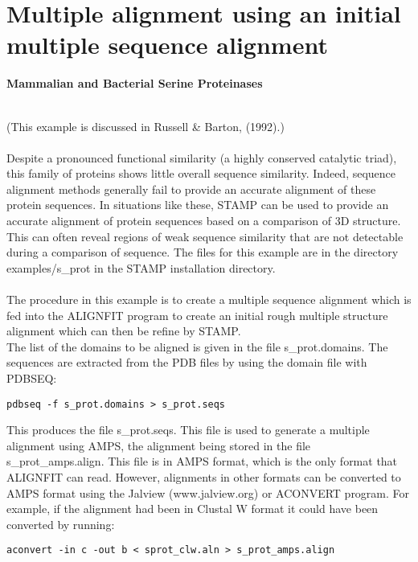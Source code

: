 \section{Multiple alignment using an initial multiple sequence alignment}

{\bf Mammalian and Bacterial Serine Proteinases}
\label{ser_prot}

\\
(This example is discussed in Russell \& Barton, (1992).\nocite{rb92b})\\
\\
Despite a pronounced functional similarity (a highly conserved catalytic 
triad), this family of proteins shows little overall sequence similarity.  
Indeed, sequence alignment methods generally fail to provide an accurate
alignment of these protein sequences.  In situations like these, STAMP 
can be used to provide an accurate alignment of protein sequences based 
on a comparison of 3D structure.  This can often reveal regions of weak 
sequence similarity that are not detectable during a comparison of 
sequence.  The files for this example are in the directory examples/s\_prot in the 
STAMP installation directory.\\
\\
The procedure in this example is to create a multiple sequence alignment which
is fed into the ALIGNFIT program to create an initial rough multiple
structure alignment which can then be refine by STAMP. 
\\
The list of the domains to be aligned is given in the file s\_prot.domains. 
The sequences are extracted from the PDB files by using the domain file
with PDBSEQ:\\

\begin{scriptsize}\begin{verbatim}
pdbseq -f s_prot.domains > s_prot.seqs
\end{verbatim} \end{scriptsize}

This produces the file s\_prot.seqs. This file is used to generate
a multiple alignment using AMPS, the alignment being stored in the file 
s\_prot\_amps.align. This file is in AMPS format, which is the only format
that ALIGNFIT can read. However, alignments in other formats can be converted
to AMPS format using the Jalview (www.jalview.org) or ACONVERT program. For example, if the alignment had been in Clustal W 
format it could have been converted by running:

\begin{scriptsize}\begin{verbatim}
aconvert -in c -out b < sprot_clw.aln > s_prot_amps.align
\end{verbatim} \end{scriptsize}

